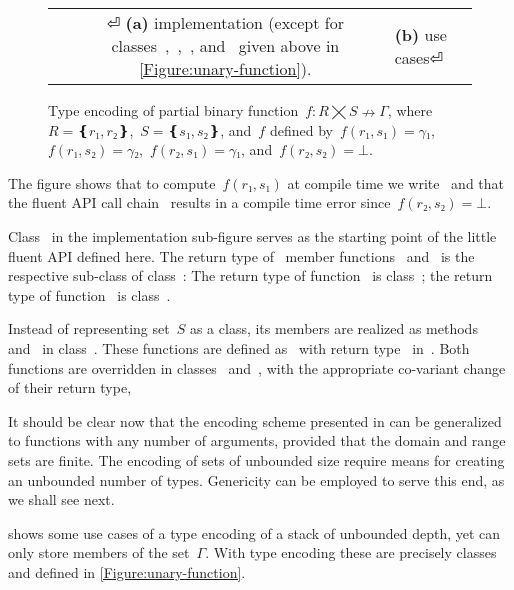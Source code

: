 \begin{figure}[hbt]
  \caption{\label{Figure:simple-binary}%
    Type encoding of partial binary function~$f: R⨉S↛Γ$,
    where~$R=❴r₁,r₂❵$,~$S=❴s₁,s₂❵$, and~$f$
  defined by~$f(r₁,s₁)=γ₁$,~$f(r₁,s₂)=γ₂$,~$f(r₂,s₁)=γ₁$, and~$f(r₂, s₂)=⊥$.}
    \begin{tabular}{cc}
      \hspace{-2.5ex}
      \parbox[c]{0.57\linewidth}{}
        &
      \hspace{-16ex}
      \parbox[c]{51ex}{}
⏎
\parbox{0.57\linewidth}{\textbf{(a)} implementation (except for classes~,~,~, and~ given above
in \cref{Figure:unary-function}).}
& \hspace{-5ex}\textbf{(b)} use cases⏎
    \end{tabular}
  \end{figure}

The figure shows that to compute~$f(r₁,s₁)$ at compile time we write~
and that the fluent API call chain~ results in
  a compile time error since~$f(r₂, s₂)=⊥$.

Class~ in the implementation sub-figure serves as
  the starting point of the little fluent API defined here.
The return type of~ member functions~ and~
  is the respective sub-class of class~:
The return type of function~ is class~;
  the return type of function~ is class~.

Instead of representing set~$S$ as a class,
  its members are realized as methods~ and~ in class~.
These functions are defined as~ with return type~
  in~.
Both functions are overridden in classes~ and~,
   with the appropriate co-variant change of their return type,

It should be clear now that the encoding scheme presented
  in  can be generalized to functions
  with any number of arguments, provided that the domain and range sets are finite.
The encoding of sets of unbounded size require means for creating an unbounded
 number of types.
Genericity can be employed to serve this end, as we shall see next.

 shows some use cases of a type encoding of
  a stack of unbounded depth, yet can only store members of the set~$Γ$.
With type encoding these are precisely classes~
  and  defined in \cref{Figure:unary-function}.

